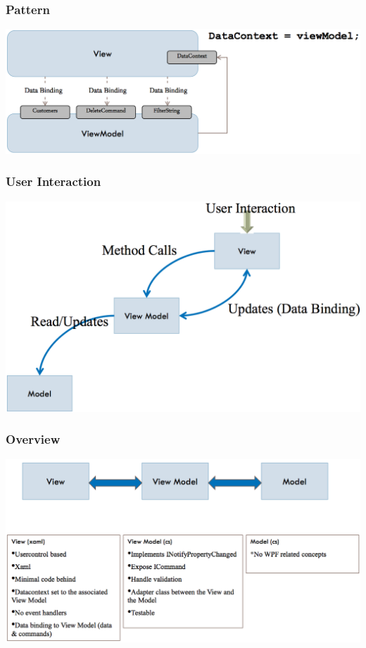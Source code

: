 \documentclass[10pt]{article}
\begin{document}
\subsubsection{Pattern}
\begin{center}
	\includegraphics[scale=0.2]{mvvm_pattern.png}	
\end{center}
\subsubsection{User Interaction}
\begin{center}
 	\includegraphics[scale=0.2]{mvvm_interaction.png}
\end{center}
\subsubsection{Overview}
\begin{center}
 	\includegraphics[scale=0.2]{mvvm_overview.png}
\end{center}
\end{document}

